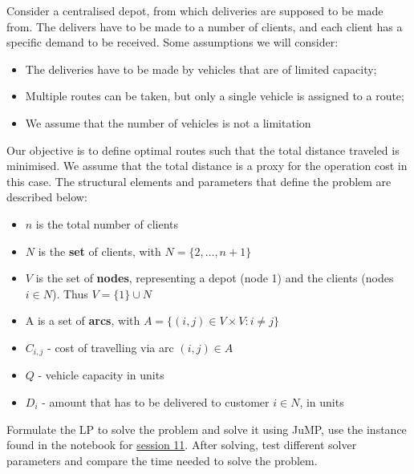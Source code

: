 Consider a centralised depot, from which deliveries are supposed to be made from. The delivers have to be made to a number of clients, and each client has a specific demand to be received. Some assumptions we will consider:

\begin{itemize}
	\item The deliveries have to be made by vehicles that are of limited capacity; 
	\item Multiple routes can be taken, but only a single vehicle is assigned to a route;
	\item We assume that the number of vehicles is not a limitation
\end{itemize}

Our objective is to define optimal routes such that the total distance traveled is minimised. We assume that the total distance is a proxy for the operation cost in this case. The structural elements and parameters that define the problem are described below:

\begin{itemize}
	\item $n$ is the total number of clients
	\item $N$ is the \textbf{set} of clients, with $N = \{2, \dots, n+1\}$
	\item $V$ is the set of \textbf{nodes}, representing a depot (node 1) and the clients (nodes $i \in N$). Thus $V = \{1\} \cup N$
	\item A is a set of \textbf{arcs}, with $A = \{(i,j) \in V \times V : i \neq j\}$
	\item $C_{i,j}$ - cost of travelling via arc $(i,j) \in A$
	\item $Q$ - vehicle capacity in units
	\item $D_i$ - amount that has to be delivered to customer $i \in N$, in units
\end{itemize}

Formulate the LP to solve the problem and solve it using JuMP, use the instance found in the notebook for \href{https://mycourses.aalto.fi/mod/folder/view.php?id=651698}{session 11}. After solving, test different solver parameters and compare the time needed to solve the problem.
	
